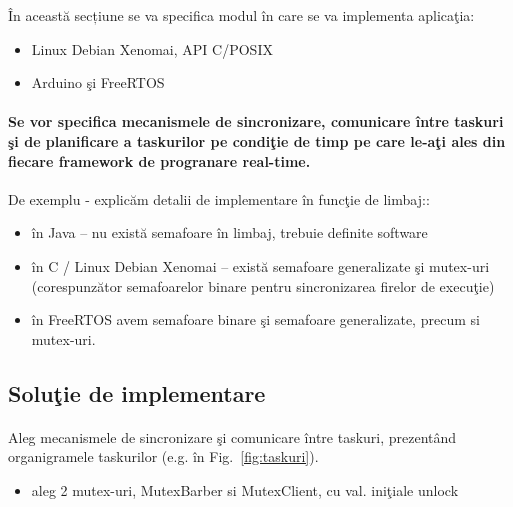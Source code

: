 \documentclass[a4paper, 11pt]{article}
\begin{document}
\^{I}n aceast\u{a} secțiune se va specifica modul \^{i}n care se va implementa aplica\c{t}ia:
\begin{itemize}
\item Linux Debian Xenomai, API C/POSIX
\item Arduino \c{s}i FreeRTOS
\end{itemize}

\paragraph{Se vor specifica mecanismele de sincronizare, comunicare \^{i}ntre taskuri \c{s}i de planificare a taskurilor pe condi\c{t}ie de timp pe care le-a\c{t}i ales din fiecare framework de progranare real-time.} De exemplu - explic\u{a}m detalii de implementare \^{i}n func\c{t}ie de limbaj:: 

\begin{itemize}
\item \^{i}n Java – nu exist\u{a} semafoare \^{i}n limbaj, trebuie definite software
\item \^{i}n C / Linux Debian Xenomai – exist\u{a} semafoare generalizate \c{s}i mutex-uri (corespunz\u{a}tor semafoarelor binare pentru sincronizarea firelor de execu\c{t}ie) 
\item \^{i}n FreeRTOS avem semafoare binare \c{s}i semafoare generalizate, precum si mutex-uri. 
\end{itemize}
\paragraph{}

\subsection*{Solu\c{t}ie de implementare}
\paragraph{}

Aleg mecanismele de sincronizare \c{s}i comunicare \^{i}ntre taskuri, prezent\^{a}nd organigramele taskurilor (e.g. \^{i}n Fig.~\ref{fig:taskuri}).

\begin{itemize}
\item aleg 2 mutex-uri, MutexBarber si MutexClient, cu val. ini\c{t}iale unlock
\end{itemize}
\paragraph{}
\end{document}
